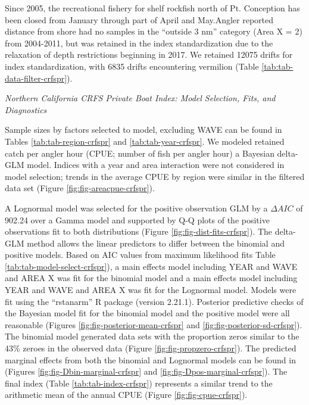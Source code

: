 \documentclass[11pt,
  english,
  a4paper,
]{article}
\begin{document}
Since 2005, the recreational fishery for shelf rockfish north of Pt. Conception has been closed from January through part of April and May.Angler reported distance from shore had no samples in the ``outside 3 nm'' category (Area X = 2) from 2004-2011, but was retained in the index standardization due to the relaxation of depth restrictions beginning in 2017. We retained 12075 drifts for index standardization, with 6835 drifts encountering vermilion (Table \ref{tab:tab-data-filter-crfspr}).

\emph{Northern California CRFS Private Boat Index: Model Selection, Fits, and Diagnostics}

Sample sizes by factors selected to model, excluding WAVE can be found in Tables \ref{tab:tab-region-crfspr} and \ref{tab:tab-year-crfspr}. We modeled retained catch per angler hour (CPUE; number of fish per angler hour) a Bayesian delta-GLM model. Indices with a year and area interaction were not considered in model selection; trends in the average CPUE by region were similar in the filtered data set (Figure \ref{fig:fig-areacpue-crfspr}).

A Lognormal model was selected for the positive observation GLM by a {\(\Delta AIC\)\leavevmode\tagmcend\tagstructend} of 902.24 over a Gamma model and supported by Q-Q plots of the positive observations fit to both distributions (Figure \ref{fig:fig-dist-fits-crfspr}). The delta-GLM method allows the linear predictors to differ between the binomial and positive models. Based on AIC values from maximum likelihood fits Table \ref{tab:tab-model-select-crfspr}), a main effects model including YEAR and WAVE and AREA X was fit for the binomial model and a main effects model including YEAR and WAVE and AREA X was fit for the Lognormal model. Models were fit using the ``rstanarm'' R package (version 2.21.1). Posterior predictive checks of the Bayesian model fit for the binomial model and the positive model were all reasonable (Figures \ref{fig:fig-posterior-mean-crfspr} and \ref{fig:fig-posterior-sd-crfspr}). The binomial model generated data sets with the proportion zeros similar to the 43\% zeroes in the observed data (Figure \ref{fig:fig-propzero-crfspr}). The predicted marginal effects from both the binomial and Lognormal models can be found in (Figures \ref{fig:fig-Dbin-marginal-crfspr} and \ref{fig:fig-Dpos-marginal-crfspr}). The final index (Table \ref{tab:tab-index-crfspr}) represents a similar trend to the arithmetic mean of the annual CPUE (Figure \ref{fig:fig-cpue-crfspr}).
\end{document}
